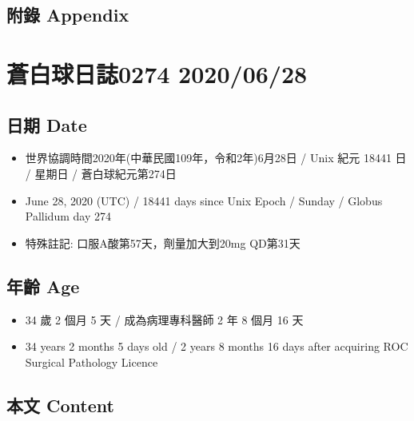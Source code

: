 \documentclass[a5paper, 11pt
]{book}
\providecommand{\tightlist}{%
  \setlength{\itemsep}{0pt}\setlength{\parskip}{0pt}}
\begin{document}
\hypertarget{ux9644ux9304-appendix-22}{%
\subsection{附錄 Appendix}\label{ux9644ux9304-appendix-22}}

\hypertarget{ux84bcux767dux7403ux65e5ux8a8c0274-20200628}{%
\section{蒼白球日誌0274
2020/06/28}\label{ux84bcux767dux7403ux65e5ux8a8c0274-20200628}}

\hypertarget{ux65e5ux671f-date-23}{%
\subsection{日期 Date}\label{ux65e5ux671f-date-23}}

\begin{itemize}
\tightlist
\item
  世界協調時間2020年(中華民國109年，令和2年)6月28日 / Unix 紀元 18441 日
  / 星期日 / 蒼白球紀元第274日
\item
  June 28, 2020 (UTC) / 18441 days since Unix Epoch / Sunday / Globus
  Pallidum day 274
\item
  特殊註記: 口服A酸第57天，劑量加大到20mg QD第31天
\end{itemize}

\hypertarget{ux5e74ux9f61-age-23}{%
\subsection{年齡 Age}\label{ux5e74ux9f61-age-23}}

\begin{itemize}
\tightlist
\item
  34 歲 2 個月 5 天 / 成為病理專科醫師 2 年 8 個月 16 天
\item
  34 years 2 months 5 days old / 2 years 8 months 16 days after
  acquiring ROC Surgical Pathology Licence
\end{itemize}

\hypertarget{ux672cux6587-content-23}{%
\subsection{本文 Content}\label{ux672cux6587-content-23}}
\end{document}
